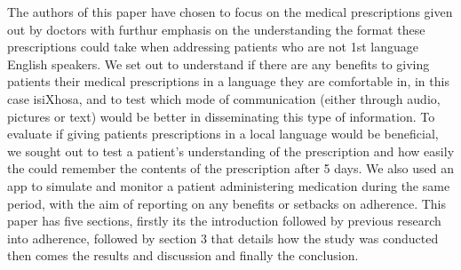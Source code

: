 The authors of this paper have chosen to focus on the medical prescriptions given out by doctors with furthur emphasis on the understanding the format these prescriptions could take when addressing patients who are not 1st language English speakers. We set out to understand if there are any benefits to giving patients their medical prescriptions in a language they are comfortable in, in this case isiXhosa, and to test which mode of communication (either through audio, pictures or text) would be better in disseminating this type of information. To evaluate if giving patients prescriptions in a local language would be beneficial, we sought out to test a patient's understanding of the prescription and how easily the could remember the contents of the prescription after 5 days. We also used an app to simulate and monitor a patient administering medication during the same period, with the aim of reporting on any benefits or setbacks on adherence. This paper has five sections, firstly its the introduction followed by previous research into adherence, followed by section 3 that details how the study was conducted then comes the results and discussion and finally the conclusion.
